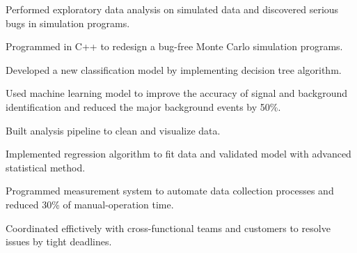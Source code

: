 \documentclass[letterpaper]{deedy-resume-openfont}
\begin{document}
\begin{tightemize}
\item Performed exploratory data analysis on simulated data and discovered serious bugs in simulation programs.
\item Programmed in C++ to redesign a bug-free Monte Carlo simulation programs.
\item Developed a new classification model by implementing decision tree algorithm.
\item Used machine learning model to improve the accuracy of signal and background identification and reduced the major background events by 50\%. 
\end{tightemize}
\sectionsep

\begin{tightemize}
\item Built analysis pipeline to clean and visualize data.
\item Implemented regression algorithm to fit data and validated model with advanced statistical method.
\item Programmed measurement system to automate data collection processes and reduced 30\% of manual-operation time.
\item Coordinated effictively with cross-functional teams and customers to resolve issues by tight deadlines.
\end{tightemize}
\sectionsep
\end{document}
